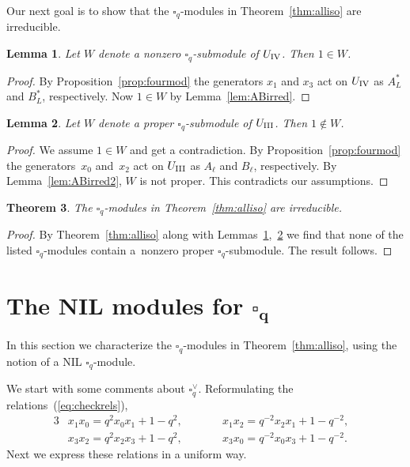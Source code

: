 \documentclass[pdftex]{sigma}
\numberwithin{equation}{section}
\newtheorem{Theorem}{Theorem}[section]
\newtheorem{Lemma}[Theorem]{Lemma}
\begin{document}
Our next goal is to show that the $\square_q$-modules in Theorem~\ref{thm:alliso} are irreducible.

\begin{Lemma} \label{lem:irred1}Let $W$ denote a nonzero $\square_q$-submodule of $U_{\rm IV}$. Then $1 \in W$.
\end{Lemma}
\begin{proof}By Proposition~\ref{prop:fourmod} the generators $x_1$ and $x_3$ act on $U_{\rm IV}$ as $A^*_L$ and $B^*_L$, respectively. Now $1 \in W$ by Lemma~\ref{lem:ABirred}.
\end{proof}

\begin{Lemma}\label{lem:irred2}Let $W$ denote a proper $\square_q$-submodule of $U_{\rm III}$. Then $1 \not\in W$.
\end{Lemma}
\begin{proof}We assume $1 \in W$ and get a contradiction. By Proposition~\ref{prop:fourmod} the genera\-tors~$x_0$ and~$x_2$ act on $U_{\rm III}$ as $A_\ell$ and $B_\ell$, respectively. By Lemma~\ref{lem:ABirred2}, $W$ is not proper. This contradicts our assumptions.
\end{proof}

\begin{Theorem}\label{thm:allirred}The $\square_q$-modules in Theorem~{\rm \ref{thm:alliso}} are irreducible.
\end{Theorem}
\begin{proof} By Theorem~\ref{thm:alliso} along with Lemmas~\ref{lem:irred1},~\ref{lem:irred2} we find that
none of the listed $\square_q$-modules contain a~nonzero proper $\square_q$-submodule. The result follows.
\end{proof}

\section[The NIL modules for $\square_q$]{The NIL modules for $\boldsymbol{\square_q}$}\label{section15}

In this section we characterize the $\square_q$-modules in Theorem~\ref{thm:alliso}, using the notion of a NIL $\square_q$-module.

We start with some comments about $\square^\vee_q$. Reformulating the relations~(\ref{eq:checkrels}),
\begin{alignat*}{3}
&x_1 x_0 = q^2 x_0 x_1 + 1-q^2, \qquad && x_1 x_2 = q^{-2} x_ 2x_1 + 1-q^{-2},&\\
&x_3 x_2 = q^2 x_2 x_3 + 1-q^2, \qquad && x_3 x_0 = q^{-2} x_0 x_3 + 1-q^{-2}.&
\end{alignat*}
Next we express these relations in a uniform way.
\end{document}
